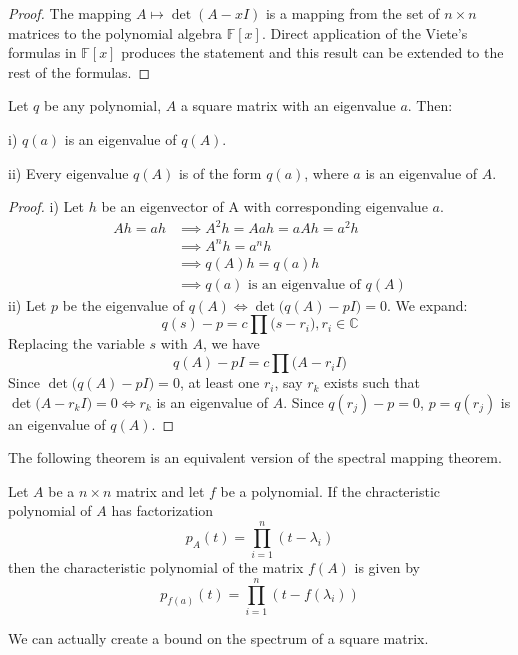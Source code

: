   \begin{proof}
  The mapping $A \mapsto \det{(A - x I)}$ is a mapping from the set of $n \times n$ matrices to the polynomial algebra $\mathbb{F}[x]$. Direct application of the Viete's formulas in $\mathbb{F}[x]$ produces the statement and this result can be extended to the rest of the formulas. 
  \end{proof}

  \begin{theorem}
  Let $q$ be any polynomial, $A$ a square matrix with an eigenvalue $a$. Then: 

  i) $q(a)$ is an eigenvalue of $q(A)$. 

  ii) Every eigenvalue $q(A)$ is of the form $q(a)$, where $a$ is an eigenvalue of $A$. 
  \end{theorem}
  \begin{proof} 
  i) Let $h$ be an eigenvector of A with corresponding eigenvalue $a$. 
  \begin{align*}
      Ah = ah & \implies A^{2} h = Aah = aAh = a^{2} h \\
   & \implies A^{n} h = a^{n} h   \\
   & \implies q(A)h = q(a)h \\
   & \implies q(a) \text{ is an eigenvalue of }q(A)
  \end{align*}
  ii) Let $p$ be the eigenvalue of $q(A) \iff \det{\big(q(A) - p I\big)} = 0$. We expand: 
  $$ q(s) - p = c\prod \big(s-r_{i}\big), r_{i} \in \mathbb{C} $$ 
  Replacing the variable $s$ with $A$, we have
  $$ q(A) - pI = c \prod \big(A-r_{i}I\big) $$
  Since $\det{\big( q(A) - pI\big)} = 0$, at least one $r_{i}$, say $r_{k}$ exists such that $\det{\big( A - r_{k} I \big)} = 0 \iff r_{k}$ is an eigenvalue of $A$. Since $q(r_{j})-p = 0$, $p = q(r_{j})$ is an eigenvalue of $q(A)$. 
  \end{proof}

  The following theorem is an equivalent version of the spectral mapping theorem.
  \begin{theorem}
  Let $A$ be a $n \times n$ matrix and let $f$ be a polynomial. If the chracteristic polynomial of $A$ has factorization 
  \[p_A (t) = \prod_{i = 1}^n (t - \lambda_i)\]
  then the characteristic polynomial of the matrix $f(A)$ is given by 
  \[p_{f(a)} (t) = \prod_{i = 1}^n (t - f(\lambda_i))\]
  \end{theorem}

  We can actually create a bound on the spectrum of a square matrix. 

